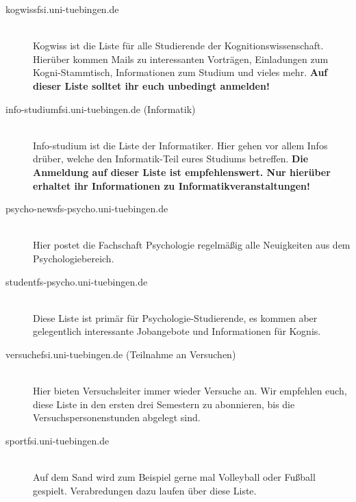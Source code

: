 \begin{description}

  \item[kogwiss\At fsi.uni-tuebingen.de] ~\\
    Kogwiss ist die Liste für alle Studierende der Kognitionswissenschaft. Hierüber kommen Mails zu interessanten Vorträgen, Einladungen zum Kogni-Stammtisch, Informationen zum Studium und vieles mehr. \textbf{Auf dieser Liste solltet ihr euch unbedingt anmelden!}

    
\item[info-studium\At fsi.uni-tuebingen.de (Informatik)] ~\\
    Info-studium ist die Liste der Informatiker. Hier gehen vor allem Infos drüber, welche den Informatik-Teil eures Studiums betreffen. \textbf{Die Anmeldung auf dieser Liste ist empfehlenswert. Nur hierüber erhaltet ihr Informationen zu Informatikveranstaltungen!}
	  
    
\item[psycho-news\At fs-psycho.uni-tuebingen.de] ~\\
    Hier postet die Fachschaft Psychologie regelmäßig alle Neuigkeiten aus dem Psychologiebereich.  

    
    
\item[student\At fs-psycho.uni-tuebingen.de] ~\\
    Diese Liste ist primär für Psychologie-Studierende, es kommen aber gelegentlich interessante Jobangebote und Informationen für Kognis. 


    
  \item[versuche\At fsi.uni-tuebingen.de (Teilnahme an Versuchen)] ~\\
	 Hier bieten Versuchsleiter immer wieder Versuche an. Wir empfehlen euch, diese Liste in den ersten drei Semestern zu abonnieren, bis die Versuchspersonenstunden abgelegt sind.
  
  
    \item[sport\At fsi.uni-tuebingen.de] ~\\
Auf dem Sand wird zum Beispiel gerne mal Volleyball oder Fußball gespielt. Verabredungen dazu laufen über diese Liste.
  

\end{description}
